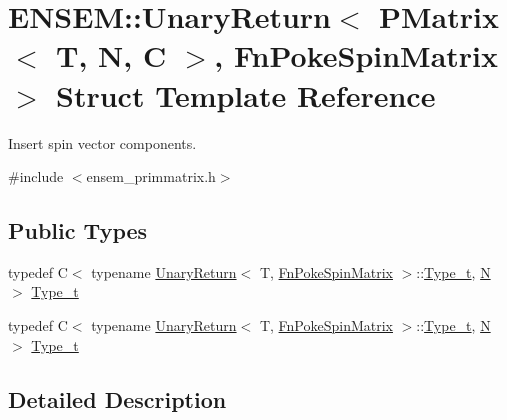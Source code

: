 \hypertarget{structENSEM_1_1UnaryReturn_3_01PMatrix_3_01T_00_01N_00_01C_01_4_00_01FnPokeSpinMatrix_01_4}{}\section{E\+N\+S\+EM\+:\+:Unary\+Return$<$ P\+Matrix$<$ T, N, C $>$, Fn\+Poke\+Spin\+Matrix $>$ Struct Template Reference}
\label{structENSEM_1_1UnaryReturn_3_01PMatrix_3_01T_00_01N_00_01C_01_4_00_01FnPokeSpinMatrix_01_4}


Insert spin vector components.  




{\ttfamily \#include $<$ensem\+\_\+primmatrix.\+h$>$}

\subsection*{Public Types}
\begin{DoxyCompactItemize}
\item 
typedef C$<$ typename \mbox{\hyperlink{structENSEM_1_1UnaryReturn}{Unary\+Return}}$<$ T, \mbox{\hyperlink{structENSEM_1_1FnPokeSpinMatrix}{Fn\+Poke\+Spin\+Matrix}} $>$\+::\mbox{\hyperlink{structENSEM_1_1UnaryReturn_3_01PMatrix_3_01T_00_01N_00_01C_01_4_00_01FnPokeSpinMatrix_01_4_abbbfcc8a97ca25a57a700734961be247}{Type\+\_\+t}}, \mbox{\hyperlink{operator__name__util_8cc_a7722c8ecbb62d99aee7ce68b1752f337}{N}} $>$ \mbox{\hyperlink{structENSEM_1_1UnaryReturn_3_01PMatrix_3_01T_00_01N_00_01C_01_4_00_01FnPokeSpinMatrix_01_4_abbbfcc8a97ca25a57a700734961be247}{Type\+\_\+t}}
\item 
typedef C$<$ typename \mbox{\hyperlink{structENSEM_1_1UnaryReturn}{Unary\+Return}}$<$ T, \mbox{\hyperlink{structENSEM_1_1FnPokeSpinMatrix}{Fn\+Poke\+Spin\+Matrix}} $>$\+::\mbox{\hyperlink{structENSEM_1_1UnaryReturn_3_01PMatrix_3_01T_00_01N_00_01C_01_4_00_01FnPokeSpinMatrix_01_4_abbbfcc8a97ca25a57a700734961be247}{Type\+\_\+t}}, \mbox{\hyperlink{operator__name__util_8cc_a7722c8ecbb62d99aee7ce68b1752f337}{N}} $>$ \mbox{\hyperlink{structENSEM_1_1UnaryReturn_3_01PMatrix_3_01T_00_01N_00_01C_01_4_00_01FnPokeSpinMatrix_01_4_abbbfcc8a97ca25a57a700734961be247}{Type\+\_\+t}}
\end{DoxyCompactItemize}


\subsection{Detailed Description}
